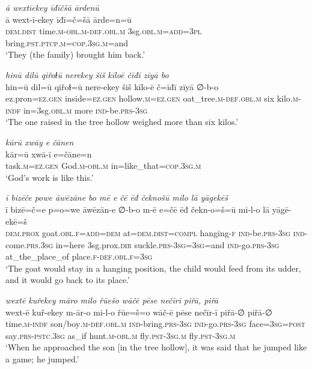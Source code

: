\ea \label{ZB.50}
\textit{ā wextīekey īđīčšā ārdenū} \\ 
\gll ā wext-ī-ekey īđī=č=šā ārde=n=ū \\ 
 \textsc{dem.dist} time\textsc{.m}\textsc{-obl}\textsc{.m}\textsc{-def}\textsc{.obl}\textsc{.m} 3sg\textsc{.obl}\textsc{.m}\textsc{=add}\textsc{=3pl} bring\textsc{.pst}\textsc{.ptcp}\textsc{.m}\textsc{=cop}\textsc{.3sg}\textsc{.m}=and \\ 
\glt `They (the family) brought him back.'
\z 
 
\ea \label{ZB.52}
\textit{hinū dilū qiřoɫū nerekey šiš kīloē čīđī zīyā bo} \\ 
\gll hin=ū dil=ū qiřoɫ=ū nere-ekey šiš kīlo-ē č=īđī zīyā ∅-b-o \\ 
 ez.pron\textsc{\textsc{=ez.gen}} inside\textsc{\textsc{=ez.gen}} hollow\textsc{.m}\textsc{\textsc{=ez.gen}} oat\_tree\textsc{.m}\textsc{-def}\textsc{.obl}\textsc{.m} six kilo\textsc{.m}\textsc{-indf} in=3sg\textsc{.obl}\textsc{.m} more \textsc{ind-}be\textsc{.prs}\textsc{-3sg} \\ 
\glt `The one raised in the tree hollow weighed more than six kilos.'
\z 
 
\ea \label{ZB.53}
\textit{kārū xwāy e čānen} \\ 
\gll kār=ū xwā-ī e=čāne=n \\ 
 task\textsc{.m}\textsc{\textsc{=ez.gen}} God\textsc{.m}\textsc{-obl}\textsc{.m} in=like\_that\textsc{=cop}\textsc{.3sg}\textsc{.m} \\ 
\glt `God’s work is like this.'
\z 
 
\ea \label{ZB.54}
\textit{ī bizēče powe āwēzāne bo mē e čē ēđ čeknošū milo lā yāgekēš} \\ 
\gll ī bizē=č=e p=o=we āwēzān-e ∅-b-o m-ē e=čē ēđ čekn-o=š=ū mi-l-o lā yāgē-ekē=š \\ 
 \textsc{dem.prox} goat\textsc{.obl}\textsc{.f}\textsc{=add}\textsc{=dem} at=\textsc{dem.dist}\textsc{=compl} hanging\textsc{-f} \textsc{ind-}be\textsc{.prs}\textsc{-3sg} \textsc{ind-}come\textsc{.prs}\textsc{.3sg} in=here 3sg.prox\textsc{.dir} suckle\textsc{.prs}\textsc{-3sg}\textsc{=3sg}=and \textsc{ind-}go\textsc{.prs}\textsc{-3sg} at\_the\_place\_of place\textsc{.f}\textsc{-def}\textsc{.obl}\textsc{.f}\textsc{=3sg} \\ 
\glt `The goat would stay in a hanging position, the child would feed from its udder, and it would go back to its place.'
\z 
 
\ea \label{ZB.56}
\textit{wextē kuřekey māro milo řūešo wāčē pēse nečīrī piřā, piřā} \\ 
\gll wext-ē kuř-ekey m-ār-o mi-l-o řūe=š=o wāč-ē pēse nečīr-ī piřā-∅ piřā-∅ \\ 
 time\textsc{.m}\textsc{-indf} son/boy\textsc{.m}\textsc{-def}\textsc{.obl}\textsc{.m} \textsc{ind-}bring\textsc{.prs}\textsc{-3sg} \textsc{ind-}go\textsc{.prs}\textsc{-3sg} face\textsc{=3sg}\textsc{=\textsc{post}} say\textsc{.prs-pstc}\textsc{.3sg} as\_if hunt\textsc{.m}\textsc{-obl}\textsc{.m} fly\textsc{.pst}\textsc{-3sg}\textsc{.m} fly\textsc{.pst}\textsc{-3sg}\textsc{.m} \\ 
\glt `When he approached the son [in the tree hollow], it was said that he jumped like a game; he jumped.'
\z 
 
